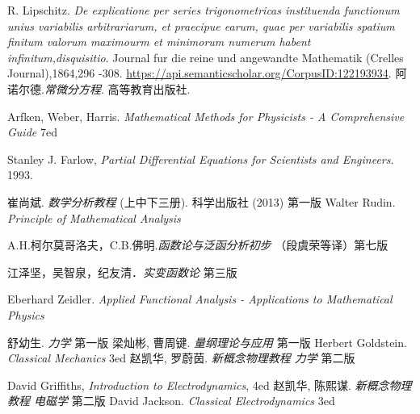 \begin{thebibliography}{99}

R. Lipschitz. \textsl{De explicatione per series trigonometricas instituenda functionum unius variabilis arbitrariarum, et praecipue earum, quae per variabilis spatium finitum valorum maximourm et minimorum numerum habent infinitum,disquisitio}. Journal fur die reine und angewandte Mathematik (Crelles Journal),1864,296 -308. \href{https://api.semanticscholar.org/CorpusID:122193934}{https://api.semanticscholar.org/CorpusID:122193934}.
阿诺尔德.\textsl{常微分方程}. 高等教育出版社.

Arfken, Weber, Harris. \textsl{Mathematical Methods for Physicists - A Comprehensive Guide} 7ed

Stanley J. Farlow, \textsl{Partial Differential Equations for Scientists and Engineers}. 1993.

崔尚斌. \textsl{数学分析教程} (上中下三册). 科学出版社 (2013) 第一版
Walter Rudin. \textsl{Principle of Mathematical Analysis}

A.H.柯尔莫哥洛夫，C.B.佛明.\textsl{函数论与泛函分析初步} （段虞荣等译）第七版

江泽坚，吴智泉，纪友清．\textsl{实变函数论} 第三版

Eberhard Zeidler. \textsl{Applied Functional Analysis - Applications to Mathematical Physics}

舒幼生. \textsl{力学} 第一版
梁灿彬, 曹周键. \textsl{量纲理论与应用} 第一版
Herbert Goldstein. \textsl{Classical Mechanics} 3ed
赵凯华, 罗蔚茵. \textsl{新概念物理教程 力学} 第二版

David Griffiths, \textsl{Introduction to Electrodynamics}, 4ed
赵凯华, 陈熙谋. \textsl{新概念物理教程 电磁学} 第二版
David Jackson. \textsl{Classical Electrodynamics} 3ed


\end{thebibliography}

